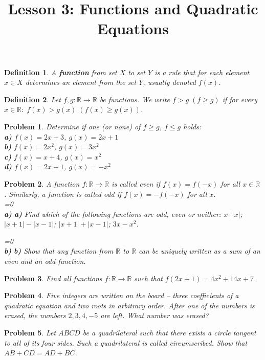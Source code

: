 \documentclass[a4paper,12pt]{article}
\title{Lesson 3: Functions and Quadratic Equations}
\theoremstyle{perfect}
\newtheorem{dfn}{Definition}
\newtheorem{prb}{Problem}
\newcommand{\varline}{0}
\newcommand{\R}{\mathbb{R}}
\renewcommand\part[1]{
\ifnum\pdfstrcmp{\varline}{1}=0
    \vspace{.10in}\textbf{\\#1)}
  \else
    \textbf{#1)}
  \fi\renewcommand{\varline}{1}}
\begin{document}
 
\maketitle

\begin{dfn}
A \textbf{function} from set $X$ to set $Y$ is a rule that for each element $x \in X$ determines an element from the set $Y$, usually denoted $f(x)$.
\end{dfn}

\begin{dfn}
Let $f,g : \R \to \R$ be functions. We write $f > g \; (f \geq g)$ if for every $x \in \R: \; f(x) > g(x) \; (f(x) \geq g(x))$.
\end{dfn}

\begin{prb}
Determine if one (or none) of $f \geq g$, $f \leq  g$ holds:\\
\textbf{a)} $f(x) = 2x + 3$, $g(x) = 2x + 1$ \\
\textbf{b)} $f(x) = 2x^2$, $g(x) = 3x^2$  \\
\textbf{c)} $f(x) = x + 4$, $g(x) = x^2$\\
\textbf{d)} $f(x) = 2x + 1$, $g(x) = -x^2$
\end{prb}


\begin{prb}
A function $f : \R \to \R$ is called \textit{even} if $f(x) = f(-x)$ for all $x \in \R$. Similarly, a function is called \textit{odd} if $f(x)= -f(-x)$ for all $x$.\\
\part{a} Find which of the following functions are odd, even or neither: $x\cdot\lvert x \rvert$; $\lvert x+1\rvert - \lvert x-1\rvert$; $\lvert x+1\rvert + \lvert x-1\rvert$; $3x - x^2$.
\part{b} Show that any function from $\R$ to $\R$ can be uniquely written as a sum of an even and an odd function.
\end{prb}

\begin{prb}
Find all functions $f : \R \to \R$ such that $f(2x+1) = 4x^2+14x+7$.
\end{prb}

\begin{prb}
Five integers are written on the board -- three coefficients of a quadratic equation and two roots in arbitrary order. After one of the numbers is erased, the numbers $2,3,4,-5$ are left. What number was erased?
\end{prb}

\begin{prb}
Let $ABCD$ be a quadrilateral such that there exists a circle tangent to all of its four sides. Such a quadrilateral is called \textit{circumscribed}. Show that $AB + CD = AD + BC$.
\end{prb}
\end{document}
